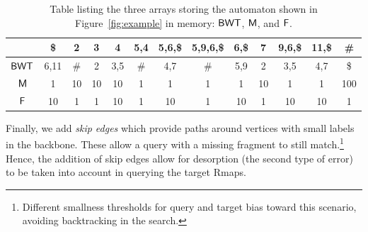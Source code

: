 \begin{table}[h!]
  \begin{center}
      \caption{Table listing the three arrays storing the automaton shown in Figure~\ref{fig:example} in memory: $\mbox{\rm {\sf BWT}}$, $\mbox{\rm {\sf M}}$, and $\mbox{\rm {\sf F}}$.}
    
  \begin{tabular}{ccccccccccccc}
  	\hline
		& \$		& 2		& 3		& 4		& 5,4		& 5,6,\$	& 5,9,6,\$	& 6,\$	& 7	& 9,6,\$	& 11,\$	& \# \\
	\hline
$\mbox{\rm {\sf BWT}}$	& 6,11	& \#		& 2		& 3,5		& \#		& 4,7		& \#		& 5,9		& 2	& 3,5		& 4,7		& \$ \\
$\mbox{\rm {\sf M}}$		& 1		& 10		& 10		& 10		& 1		& 1		& 1		& 1		&10	& 1		& 1 		& 100 \\
$\mbox{\rm {\sf F}}$		& 10		& 1		& 1		& 10		& 1		& 10		& 1		& 10		& 1	& 10		& 10		& 1 \\		
	\hline
	\end{tabular}
 \label{bwt-table}
\end{center}
\end{table}



Finally, we add {\em skip edges} which provide paths around vertices with small labels in the backbone.
These allow a query with a missing fragment to still match.\footnote{Different smallness thresholds for query and target bias toward this scenario, avoiding backtracking in the search.}  Hence, the addition of skip edges allow for desorption (the second type of error) to be taken into account in querying the target Rmaps.






